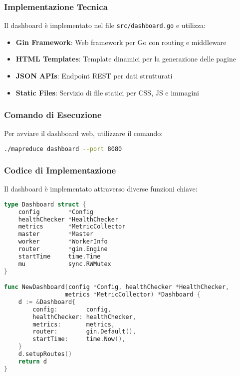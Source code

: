 \documentclass[12pt,a4paper]{article}
\begin{document}
\subsubsection{Implementazione Tecnica}

Il dashboard è implementato nel file \texttt{src/dashboard.go} e utilizza:

\begin{itemize}
\item \textbf{Gin Framework}: Web framework per Go con routing e middleware
\item \textbf{HTML Templates}: Template dinamici per la generazione delle pagine
\item \textbf{JSON APIs}: Endpoint REST per dati strutturati
\item \textbf{Static Files}: Servizio di file statici per CSS, JS e immagini
\end{itemize}

\subsubsection{Comando di Esecuzione}

Per avviare il dashboard web, utilizzare il comando:

\begin{lstlisting}[language=bash, caption=Comando per avviare il dashboard]
./mapreduce dashboard --port 8080
\end{lstlisting}

\subsubsection{Codice di Implementazione}

Il dashboard è implementato attraverso diverse funzioni chiave:

\begin{lstlisting}[language=go, caption=Struttura Dashboard e Inizializzazione]
type Dashboard struct {
    config        *Config
    healthChecker *HealthChecker
    metrics       *MetricCollector
    master        *Master
    worker        *WorkerInfo
    router        *gin.Engine
    startTime     time.Time
    mu            sync.RWMutex
}

func NewDashboard(config *Config, healthChecker *HealthChecker, 
                 metrics *MetricCollector) *Dashboard {
    d := &Dashboard{
        config:        config,
        healthChecker: healthChecker,
        metrics:       metrics,
        router:        gin.Default(),
        startTime:     time.Now(),
    }
    d.setupRoutes()
    return d
}
\end{lstlisting}
\end{document}
